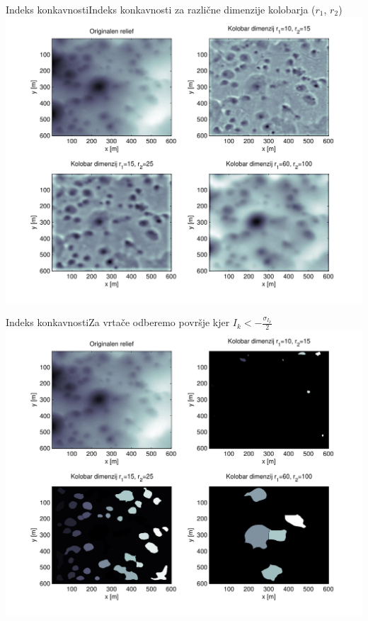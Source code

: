 \documentclass{beamer}
\begin{document}
\begin{frame}{Indeks konkavnosti}{Indeks konkavnosti za različne dimenzije kolobarja ($r_1$, $r_2$)}
    \includegraphics[width=\textwidth]{slike/concavity-samples}
\end{frame}

\begin{frame}{Indeks konkavnosti}{Za vrtače odberemo površje kjer $I_k < - \frac{\sigma_{I_k}}{2}$}
    \includegraphics[width=\textwidth]{slike/concavity-segmentation-samples}
\end{frame}
\end{document}

